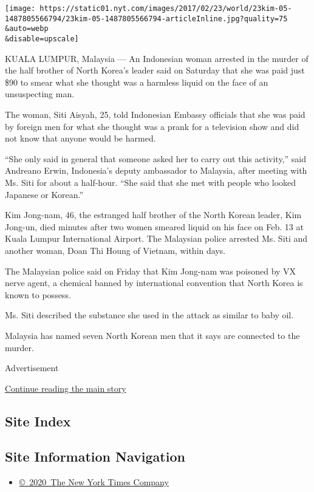 \texttt{[image: https://static01.nyt.com/images/2017/02/23/world/23kim-05-1487805566794/23kim-05-1487805566794-articleInline.jpg?quality=75\\\&auto=webp\\\&disable=upscale]}

KUALA LUMPUR, Malaysia --- An Indonesian woman arrested in the murder of
the half brother of North Korea's leader said on Saturday that she was
paid just \$90 to smear what she thought was a harmless liquid on the
face of an unsuspecting man.

The woman, Siti Aisyah, 25, told Indonesian Embassy officials that she
was paid by foreign men for what she thought was a prank for a
television show and did not know that anyone would be harmed.

``She only said in general that someone asked her to carry out this
activity,'' said Andreano Erwin, Indonesia's deputy ambassador to
Malaysia, after meeting with Ms. Siti for about a half-hour. ``She said
that she met with people who looked Japanese or Korean.''

Kim Jong-nam, 46, the estranged half brother of the North Korean leader,
Kim Jong-un, died minutes after two women smeared liquid on his face on
Feb. 13 at Kuala Lumpur International Airport. The Malaysian police
arrested Ms. Siti and another woman, Doan Thi Houng of Vietnam, within
days.

The Malaysian police said on Friday that Kim Jong-nam was poisoned by VX
nerve agent, a chemical banned by international convention that North
Korea is known to possess.

Ms. Siti described the substance she used in the attack as similar to
baby oil.

Malaysia has named seven North Korean men that it says are connected to
the murder.

Advertisement

\protect\hyperlink{after-bottom}{Continue reading the main story}

\hypertarget{site-index}{%
\subsection{Site Index}\label{site-index}}

\hypertarget{site-information-navigation}{%
\subsection{Site Information
Navigation}\label{site-information-navigation}}

\begin{itemize}
\tightlist
\item
  \href{https://help.nytimes.com/hc/en-us/articles/115014792127-Copyright-notice}{©~2020~The
  New York Times Company}
\end{itemize}

